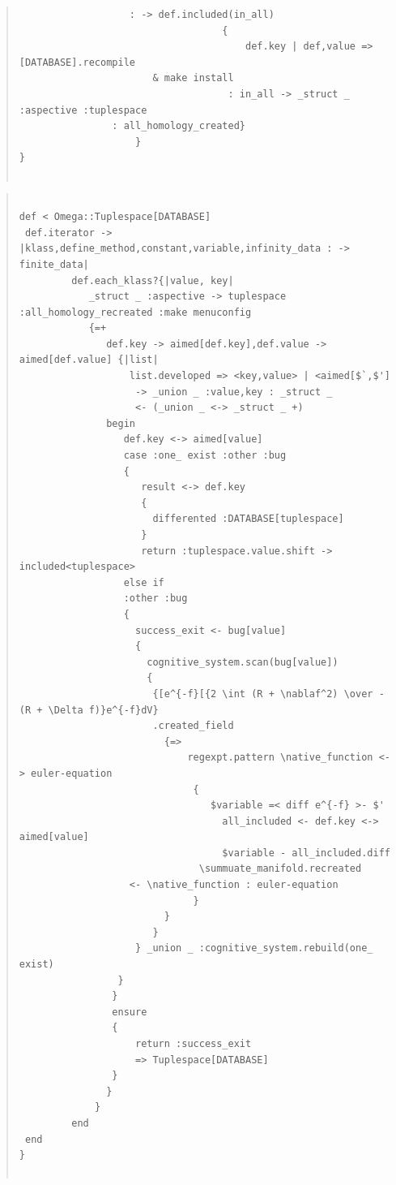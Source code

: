 \documentclass{jsarticle}
\begin{document}
{\begin{quote}
\begin{verbatim}
				   : -> def.included(in_all)
                                   { 
                                       def.key | def,value => [DATABASE].recompile
				       & make install
                                    : in_all -> _struct _ :aspective :tuplespace
			    : all_homology_created}
                    }
}
                                     

\end{verbatim}
\end{quote}


\begin{quote}
\setlength{\baselineskip}{12pt}
\begin{verbatim}

def < Omega::Tuplespace[DATABASE] 
 def.iterator -> |klass,define_method,constant,variable,infinity_data : -> finite_data|
         def.each_klass?{|value, key|
            _struct _ :aspective -> tuplespace :all_homology_recreated :make menuconfig
            {=+
               def.key -> aimed[def.key],def.value -> aimed[def.value] {|list|
                   list.developed => <key,value> | <aimed[$`,$']
                    -> _union _ :value,key : _struct _ 
                    <- (_union _ <-> _struct _ +)
               begin
                  def.key <-> aimed[value]
                  case :one_ exist :other :bug
                  {
                     result <-> def.key
                     {
                       differented :DATABASE[tuplespace]
                     }
                     return :tuplespace.value.shift -> included<tuplespace>
                  else if
                  :other :bug 
                  { 
                    success_exit <- bug[value]
                    {
                      cognitive_system.scan(bug[value])
                      {
                       {[e^{-f}[{2 \int (R + \nablaf^2) \over -(R + \Delta f)}e^{-f}dV}
				       .created_field
                         {=>
                             regexpt.pattern \native_function <-> euler-equation
                              {
                                 $variable =< diff e^{-f} >- $'
                                   all_included <- def.key <-> aimed[value]
                                   $variable - all_included.diff
                               \summuate_manifold.recreated 
			       <- \native_function : euler-equation
                              }
                         }
                       }
                    } _union _ :cognitive_system.rebuild(one_ exist)
                 }
                }
                ensure
                {
                    return :success_exit
                    => Tuplespace[DATABASE]
                }
               } 
             }
         end
 end
}


\end{verbatim}
\end{quote}}
\end{document}
